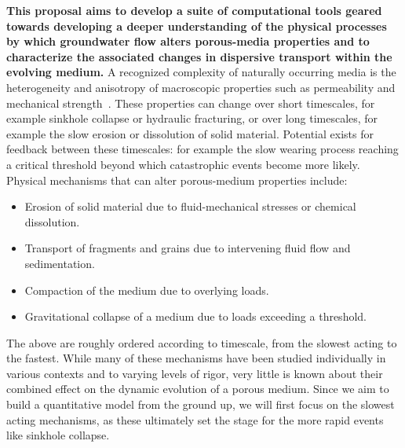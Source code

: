 \documentclass[11pt]{article}
\begin{document}
{\bf This proposal aims to develop a suite of computational tools geared towards developing a deeper understanding of the physical processes by which groundwater flow alters porous-media properties and to characterize the associated changes in dispersive transport within the evolving medium.} A recognized complexity of naturally occurring media is the heterogeneity and anisotropy of macroscopic properties such as permeability and mechanical strength~\cite{neuman1987stochastic, moyner2016multiscale, lin2018randomization}. These properties can change over short timescales, for example sinkhole collapse or hydraulic fracturing, or over long timescales, for example the slow erosion or dissolution of solid material. Potential exists for feedback between these timescales: for example the slow wearing process reaching a critical threshold beyond which catastrophic events become more likely.  Physical mechanisms that can alter porous-medium properties include: 
\begin{itemize}[noitemsep,topsep=0pt]
\item Erosion of solid material due to fluid-mechanical stresses or chemical dissolution.
\item Transport of fragments and grains due to intervening fluid flow and sedimentation.
\item Compaction of the medium due to overlying loads.
\item Gravitational collapse of a medium due to loads exceeding a threshold.
\end{itemize}
The above are roughly ordered according to timescale, from the slowest acting to the fastest. While many of these mechanisms have been studied individually in various contexts and to varying levels of rigor, very little is known about their combined effect on the dynamic evolution of a porous medium. Since we aim to build a quantitative model from the ground up, we will first focus on the slowest acting mechanisms, as these ultimately set the stage for the more rapid events like sinkhole collapse. 
\end{document}
